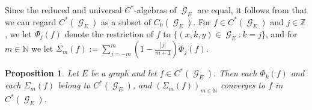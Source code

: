 \documentclass[12pt, a4paper]{amsart}
\numberwithin{equation}{section}
\newtheorem{prop}[thm]{Proposition}
\theoremstyle{definition}
\theoremstyle{remark}
\begin{document}
Since the reduced and universal $C^*$-algebras of ${\operatorname{\mathcal{G}}}_E$ are equal, it follows from \cite[Proposition II.4.2(i)]{Ren} that we can regard $C^*({\operatorname{\mathcal{G}}}_E)$ as a subset of $C_0({\operatorname{\mathcal{G}}}_E)$. For $f\in C^*({\operatorname{\mathcal{G}}}_E)$ and $j\in{\mathbb{Z}}$, we let $\Phi_j(f)$ denote the restriction of $f$ to $\{(x,k,y)\in{\operatorname{\mathcal{G}}}_E:k=j\}$, and for $m\in{\mathbb{N}}$ we let $\Sigma_m(f):=\sum_{j=-m}^m(1-\frac{|j|}{m+1})\Phi_j(f)$.

\begin{prop} \label{prop:cesaro}
	Let $E$ be a graph and let $f\in C^*({\operatorname{\mathcal{G}}}_E)$. Then each $\Phi_k(f)$ and each $\Sigma_m(f)$ belong to $C^*({\operatorname{\mathcal{G}}}_E)$, and $(\Sigma_m(f))_{m\in{\mathbb{N}}}$ converges to $f$ in $C^*({\operatorname{\mathcal{G}}}_E)$.
\end{prop}
\end{document}
